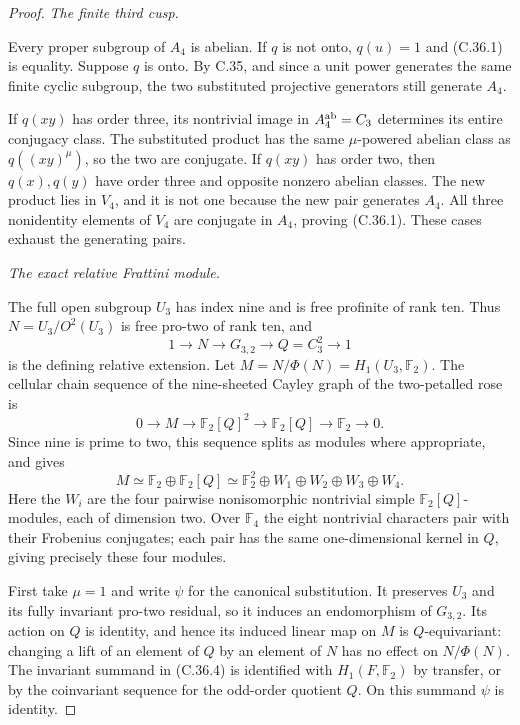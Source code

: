 \begin{proof}
\emph{The finite third cusp.}\par
Every proper subgroup of \(A_4\) is abelian. If \(q\) is
not onto, \(q(u)=1\) and (C.36.1) is equality.
Suppose \(q\) is onto. By C.35, and since a unit power
generates the same finite cyclic subgroup, the two substituted
projective generators still generate \(A_4\).

If \(q(xy)\) has order three, its nontrivial image in
\(A_4^{\rm ab}=C_3\) determines its entire conjugacy class.
The substituted product has the same \(\mu\)-powered
abelian class as \(q((xy)^\mu)\), so the two are conjugate.
If \(q(xy)\) has order two, then \(q(x),q(y)\) have
order three and opposite nonzero abelian classes. The new
product lies in \(V_4\), and it is not one because the new
pair generates \(A_4\). All three nonidentity elements of
\(V_4\) are conjugate in \(A_4\), proving (C.36.1).
These cases exhaust the generating pairs.

\emph{The exact relative Frattini module.}\par
The full open subgroup \(U_3\) has index nine and is free
profinite of rank ten. Thus \(N=U_3/O^2(U_3)\) is free
pro-two of rank ten, and
\[
                    1\longrightarrow N\longrightarrow G_{3,2}
                       \longrightarrow Q=C_3^2\longrightarrow1
\]
is the defining relative extension. Let
\(M=N/\Phi(N)=H_1(U_3,\mathbb F_2)\).
The cellular chain sequence of the nine-sheeted Cayley graph
of the two-petalled rose is
\[
 0\longrightarrow M\longrightarrow\mathbb F_2[Q]^2
   \longrightarrow\mathbb F_2[Q]\longrightarrow\mathbb F_2
   \longrightarrow0.
\]
Since nine is prime to two, this sequence splits as modules
where appropriate, and gives
\[
 M\simeq\mathbb F_2\oplus\mathbb F_2[Q]
       \simeq\mathbb F_2^2\oplus W_1\oplus W_2\oplus W_3\oplus W_4.
 \tag{C.36.4}
\]
Here the \(W_i\) are the four pairwise nonisomorphic
nontrivial simple \(\mathbb F_2[Q]\)-modules, each of
dimension two. Over \(\mathbb F_4\) the eight nontrivial
characters pair with their Frobenius conjugates; each pair
has the same one-dimensional kernel in \(Q\), giving
precisely these four modules.

First take \(\mu=1\) and write \(\psi\) for the
canonical substitution. It preserves \(U_3\) and its
fully invariant pro-two residual, so it induces an
endomorphism of \(G_{3,2}\). Its action on \(Q\) is
identity, and hence its induced linear map on \(M\) is
\(Q\)-equivariant: changing a lift of an element of
\(Q\) by an element of \(N\) has no effect on
\(N/\Phi(N)\). The invariant summand in (C.36.4) is
identified with \(H_1(F,\mathbb F_2)\) by transfer, or
by the coinvariant sequence for the odd-order quotient
\(Q\). On this summand \(\psi\) is identity.


\end{proof}
